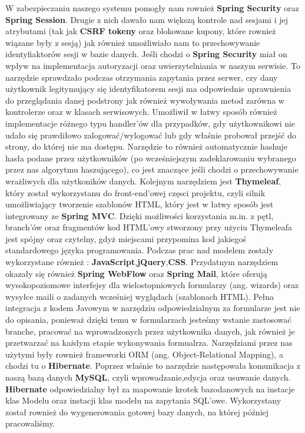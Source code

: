 \documentclass[a4paper]{article}
\begin{document}
\linebreak
W zabezpieczaniu naszego systemu pomogły nam rownież \textbf{Spring Security} oraz \textbf{Spring Session}. Drugie z nich dawało nam większą kontrole nad sesjami i jej atrybutami (tak jak \textbf{CSRF tokeny} oraz blokowane kupony, które rownież wiązane były z sesją) jak również umożliwiało nam to przechowywanie identyfiaktorów sesji w bazie danych. Jeśli chodzi o \textbf{Spring Security} miał on wpływ na implementacja autoryzacji oraz uwierzytelniania w naszym serwisie. To narzędzie sprawdzało podczas otrzymania zapytania przez serwer, czy dany użytkownik legitymujący się identyfikatorem sesji ma odpowiednie uprawnienia do przeglądania danej podstrony jak również wywoływania metod zarówna w kontrolerze oraz w klasach serwisowych. Umożliwił w łatwy sposób również implementacje różnego typu handler'ów dla przypadków, gdy użytkownikowi nie udało się prawdiłowo zalogować/wylogować lub gdy właśnie probował przejść do strony, do której nie ma dostępu. Narzędzie to również automatycznie hashuje hasła podane przez użytkowników (po wcześniejszym zadeklarowaniu wybranego przez nas algorytmu haszującego), co jest znaczące jeśli chodzi o przechowywanie wrażliwych dla użytkoników danych.
\linebreak
Kolejnym narzędziem jest \textbf{Thymeleaf}, który został wykorzystanu do front-end'owej częsci projektu, czyli silnik umożliwiający tworzenie szablonów HTML, który jest w łatwy sposób jest integrowany ze \textbf{Spring MVC}.  Dzięki możliwości korzystania m.in. z pętl, branch'ów oraz fragmentów kod HTML'owy stworzony przy użyciu Thymeleafa jest spójny oraz czytelny, gdyż miejscami przypomina kod jakiegoś standardowego języka programowania. Podczas prac nad modelem zostały wykorzystane również : \textbf{JavaScript},\textbf{jQuery},\textbf{CSS}.
\linebreak
Przydatnym narzędziem okazały się również \textbf{Spring WebFlow} oraz \textbf{Spring Mail}, które oferują wysokopoziomowe interfejsy dla wielostopniowych formularzy (ang. wizards) oraz wysyłce maili o zadanych wcześniej wyglądach (szablonach HTML). Pełna integracja z kodem Javowym w narzędziu odpowiedzialnym za formularze jest nie do opisania, ponieważ dzięki temu w formularzach jesteśmy wstanie zastosować branche, pracować na wprowadzonych przez użytkownika danych, jak również je przetwarzać na każdym etapie wykonywania formualrza.
\linebreak
Narzędziami przez nas użytymi były rownież frameworki ORM (ang. Object-Relational Mapping), a chodzi tu o \textbf{Hibernate}. Poprzez właśnie to narzędzie następowała komunikacja z naszą bazą danych \textbf{MySQL}, czyli wprowadzanie,edycja oraz usuwanie danych. \textbf{Hibernate} odpowiedzialny był za mapowanie krotek bazodanowych na instacje klas Modelu oraz instacji klas modelu na zapytania SQL'owe. Wykorzystany został rownież do wygenerowania gotowej bazy danych, na której później pracowaliśmy.
\end{document}
